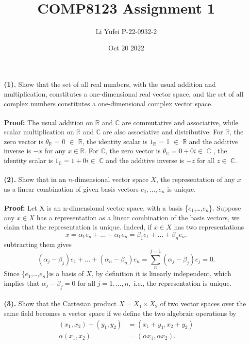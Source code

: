 \documentclass{homework}
\title{COMP8123 \quad Assignment 1}
\author{Li Yufei \quad P-22-0932-2}
\date{Oct 20 2022}
\begin{document}
\maketitle

\textbf{(1). }Show that the set of all real numbers, with the usual addition and multiplication, constitutes a one-dimensional real vector space, and the set of all complex numbers constitutes a one-dimensional complex vector space.
\\
\\
\textbf{Proof: }The usual addition on $\mathbb{R}$ and $\mathbb{C}$ are commutative and associative, while scalar multiplication on $\mathbb{R}$ and $\mathbb{C}$ are also associative and distributive. 
For $\mathbb{R}$, the zero vector is {$\theta_{\mathbb{R}}$} = 0 $\in$ $\mathbb{R}$, the identity scalar is {$1_{\mathbb{R}}$} = 1 $\in$ $\mathbb{R}$ and the additive inverse is $-x$ for any $x \in \mathbb{R}$. 
For $\mathbb{C}$, the zero vector is $\theta_{\mathbb{C}}= 0 + 0i\in$ $\mathbb{C}$ , the identity scalar is $1_{\mathbb{C}}= 1 + 0i\in$ $\mathbb{C}$ and the additive inverse is $-z$ for all $z \in$ $\mathbb{C}$.
\\
\\
\textbf{(2). }Show that in an $n$-dimensional vector space $X$, the representation of any $x$ as a linear combination of given basis vectors $e_1, \ldots, e_n$ is unique.
\\
\\
\textbf{Proof: } Let X is an n-dimensional vector space, with a basis \{{$e_1$},\ldots,{$e_n$}\}. Suppose any $x \in X$ has a representation as a linear combination of the basis vectors, we claim that the representation is unique. Indeed, if $x \in X$ has two representations
$$
x = {\alpha_1}{e_n}+\ldots+{\alpha_1}{e_n}={\beta_1}{e_1}+\ldots+{\beta_n}{e_n}.
$$
subtracting them gives
$$
({\alpha_j}-{\beta_j}){e_1}+...+({\alpha_n}-{\beta_n}){e_n}=\sum_{n}^{j=1}({\alpha_j}-{\beta_j}){e_j}=0.
$$
Since \{{$e_1$},\ldots,{$e_n$}\}is a basis of $X$, by definition it is linearly independent, which implies that $\alpha_j-\beta_j = 0$ for all $j = 1,\ldots,n,$ i.e., the representation is unique.
\\
\\
\textbf{(3). }Show that the Cartesian product $X=X_1 \times X_2$ of two vector spaces over the same field becomes a vector space if we define the two algebraic operations by
$$
\begin{aligned}
\left(x_1, x_2\right)+\left(y_1, y_2\right) &=\left(x_1+y_1, x_2+y_2\right) \\
\alpha\left(x_1, x_2\right) &=\left(\alpha x_1, \alpha x_2\right) .
\end{aligned}
$$
\end{document}
